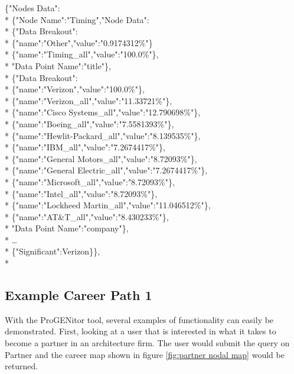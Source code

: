 \pagebreak
\begin{tt}
\begin{footnotesize}
\noindent \{"Nodes Data":\\*
	\indent \{"Node Name":"Timing","Node Data":\\*
		\indent \{"Data Breakout":\\*
		\indent \indent	\{"name":"Other","value":"0.9174312\%"\}\\*
		\indent	\indent \{"name":"Timing\_all","value":"100.0\%"\},\\*
		\indent	"Data Point Name":"title"\},\\*
		\indent\{"Data Breakout":\\*
		\indent	\indent	\{"name":"Verizon","value":"100.0\%"\},\\*
		\indent	\indent	\{"name":"Verizon\_all","value":"11.33721\%"\},\\*
		\indent	\indent	\{"name":"Cisco Systems\_all","value":"12.790698\%"\},\\*
		\indent	\indent	\{"name":"Boeing\_all","value":"7.5581393\%"\},\\*
		\indent	\indent	\{"name":"Hewlit-Packard\_all","value":"8.139535\%"\},\\*
		\indent	\indent	\{"name":"IBM\_all","value":"7.2674417\%"\},\\*
		\indent	\indent	\{"name":"General Motors\_all","value":"8.72093\%"\},\\*
		\indent	\indent	\{"name":"General Electric\_all","value":"7.2674417\%"\},\\*
		\indent	\indent	\{"name":"Microsoft\_all","value":"8.72093\%"\},\\*
		\indent	\indent	\{"name":"Intel\_all","value":"8.72093\%"\},\\*
		\indent	\indent	\{"name":"Lockheed Martin\_all","value":"11.046512\%"\},\\*
		\indent	\indent	\{"name":"AT\&T\_all","value":"8.430233\%"\},\\*
		\indent"Data Point Name":"company"\},\\*
		\indent\ldots\\*
		\indent \{"Significant":Verizon\}\},\\*
\end{footnotesize}
\end{tt}

\subsection{Example Career Path 1}
With the ProGENitor tool, several examples of functionality can easily be
demonstrated.  First, looking at a user that is interested in what it takes to
become a partner in an architecture firm.  The user would submit the query on
Partner and the career map shown in figure \ref{fig:partner nodal map} would be
returned.

